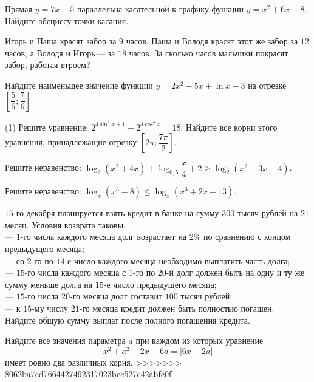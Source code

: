 \begin{homework}[number=2]
\begin{listofex}
\begin{minipage}[t]{\picwidth}
		\end{minipage}
		\item Прямая \( y=7x-5 \) параллельна касательной к графику функции \( y=x^2+6x-8 \). Найдите абсциссу точки касания.
		\item Игорь и Паша красят забор за \( 9 \) часов. Паша и Володя красят этот же забор за \( 12 \) часов, а Володя и Игорь --- за \( 18 \) часов. За сколько часов мальчики покрасят забор, работая втроем?
		\item Найдите наименьшее значение функции \( y=2x^2-5x+\ln x-3 \) на отрезке \( \left[ \dfrac{5}{6}; \dfrac{7}{6} \right] \)
		\item \begin{tasks}(1)
			\task Решите уравнение: \( 2^{4\sin^2x+1}+2^{4\cos^2x}=18 \).
			\task Найдите все корни этого уравнения, принадлежащие отрезку \( \left[ 2\pi; \dfrac{7\pi}{2} \right] \).
		\end{tasks}
		\item Решите неравенство: \( \log_2(x^2+4x)+\log_{0,5}\dfrac{x}{4}+2\ge\log_2(x^2+3x-4)\).
		\item Решите неравенство: \( \log_x(x^3-8)\le\log_x(x^3+2x-13) \).
		\item \( 15 \)-го декабря планируется взять кредит в банке на сумму \( 300 \) тысяч рублей на \( 21 \) месяц. Условия возврата таковы:\\		
		--- \( 1 \)-го числа каждого месяца долг возрастает на \( 2\% \) по сравнению с концом предыдущего месяца;\\
		--- со \( 2 \)-го по \( 14 \)-е число каждого месяца необходимо выплатить часть долга;\\
		--- \( 15 \)-го числа каждого месяца с \( 1 \)-го по \( 20 \)-й долг должен быть на одну и ту же сумму меньше долга на \( 15 \)-е число предыдущего месяца;\\		
		--- \( 15 \)-го числа \( 20 \)-го месяца долг составит \( 100 \) тысяч рублей;\\
		--- к \( 15 \)-му числу \( 21 \)-го месяца кредит должен быть полностью погашен.\\
		Найдите общую сумму выплат после полного погашения кредита.
		\item Найдите все значения параметра \( a \) при каждом из которых уравнение
		\[x^2+a^2-2x-6a=|6x-2a|\]
		имеет ровно два различных корня.
>>>>>>> 8062ba7ed7664427492317023bec527c42abfc0f
	\end{listofex}
\end{homework}

